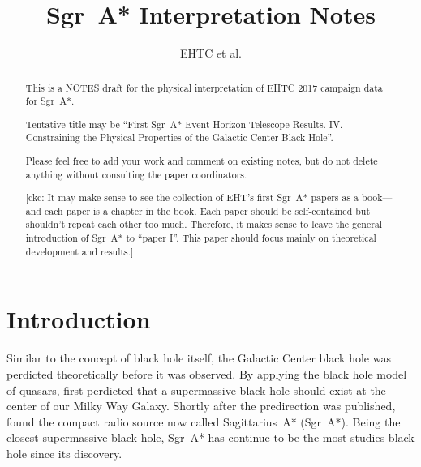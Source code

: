\documentclass[twocolumn,tighten,dvipsnames]{aastex63}
\newcommand\sgra{Sgr~A*\xspace}
\newcommand\<{{\langle}}
\renewcommand\>{{\rangle}} %
\newcommand\ckc[1]{{\color{MidnightBlue}[ckc: #1]}}
\begin{document}
\title{\sgra Interpretation Notes}
\author{EHTC et al.}

\shorttitle{\sgra Interpretation}

\revised{\today}

\begin{abstract}
  \color{BrickRed}

  This is a NOTES draft for the physical interpretation of EHTC 2017
  campaign data for \sgra.

  Tentative title may be ``First \sgra Event Horizon Telescope
  Results. IV. Constraining the Physical Properties of the Galactic
  Center Black Hole''.

  Please feel free to add your work and comment on existing notes, but
  do not delete anything without consulting the paper coordinators.

  \ckc{It may make sense to see the collection of EHT's first \sgra
    papers as a book---and each paper is a chapter in the book.
    Each paper should be self-contained but shouldn't repeat each
    other too much.
    Therefore, it makes sense to leave the general introduction of
    \sgra to ``paper I''.
    This paper should focus mainly on theoretical development and
    results.}
\end{abstract}


\section{Introduction} \label{sec:intro}

Similar to the concept of black hole itself, the Galactic Center black
hole was perdicted theoretically before it was observed.
By applying the black hole model of quasars,
\citet{1971MNRAS.152..461L} first perdicted that a supermassive black
hole should exist at the center of our Milky Way Galaxy.
Shortly after the predirection was published,
\citet{1974ApJ...194..265B, 1975A&A....43..159E, 1975ApJ...202L..63L}
found the compact radio source now called Sagittarius~A* (\sgra).
Being the closest supermassive black hole, \sgra has continue to be
the most studies black hole since its discovery.
\end{document}

